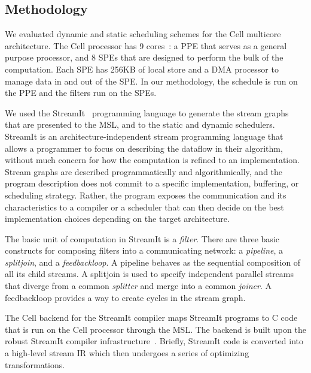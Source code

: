 \subsection{Methodology}

We evaluated dynamic and static scheduling schemes for the Cell
multicore architecture. The Cell processor has 9
cores~\cite{Cell-hpca}: a PPE that serves as a general purpose
processor, and 8 SPEs that are designed to perform the bulk of the
computation. Each SPE has 256KB of local store and a DMA processor to
manage data in and out of the SPE. In our methodology, the schedule is
run on the PPE and the filters run on the SPEs.

We used the StreamIt~\cite{streamitweb} programming language to
generate the stream graphs that are presented to the MSL, and to the
static and dynamic schedulers. StreamIt is an architecture-independent
stream programming language that allows a programmer to focus on
describing the dataflow in their algorithm, without much concern for
how the computation is refined to an implementation. Stream graphs are
described programmatically and algorithmically, and the program
description does not commit to a specific implementation, buffering, or
scheduling strategy. Rather, the program exposes the communication and
its characteristics to a compiler or a scheduler that can then decide
on the best implementation choices depending on the target
architecture.

The basic unit of computation in StreamIt is a  {\it filter}. There
are three basic constructs for composing filters into a communicating
network: a {\it pipeline}, a {\it splitjoin}, and a {\it
feedbackloop}. A pipeline behaves as the sequential composition of all
its child streams. A splitjoin is used to specify independent parallel
streams that diverge from a common {\it splitter} and merge into a
common {\it joiner}. A feedbackloop provides a way to create cycles in
the stream graph.

The Cell backend for the StreamIt compiler maps StreamIt programs to C
code that is run on the Cell processor through the MSL. The backend is
built upon the robust StreamIt compiler
infrastructure~\cite{asplos06}.  Briefly, StreamIt code is converted
into a high-level stream IR which then undergoes a series of
optimizing transformations.


